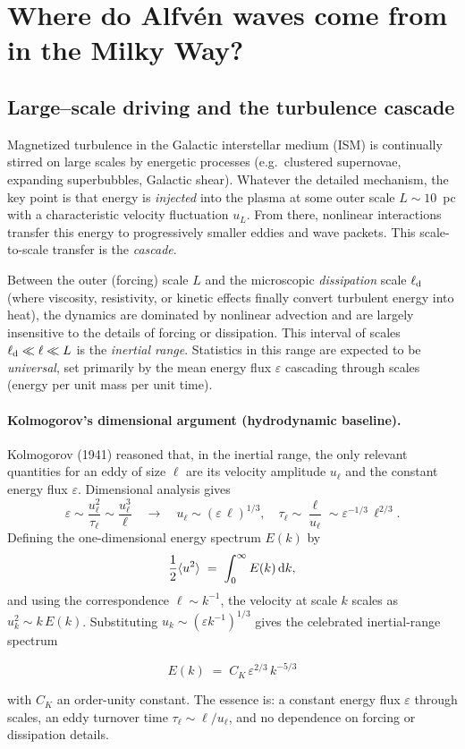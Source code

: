 \section{Where do Alfv\'en waves come from in the Milky Way?}
\subsection{Large–scale driving and the turbulence cascade}

Magnetized turbulence in the Galactic interstellar medium (ISM) is continually stirred on large scales by energetic processes (e.g.\ clustered supernovae, expanding superbubbles, Galactic shear). Whatever the detailed mechanism, the key point is that energy is \emph{injected} into the plasma at some outer scale \(L \sim 10 \)~pc with a characteristic velocity fluctuation \(u_L\). From there, nonlinear interactions transfer this energy to progressively smaller eddies and wave packets. This scale-to-scale transfer is the \emph{cascade}. 

Between the outer (forcing) scale \(L\) and the microscopic \emph{dissipation} scale \(\ell_{\rm d}\) (where viscosity, resistivity, or kinetic effects finally convert turbulent energy into heat), the dynamics are dominated by nonlinear advection and are largely insensitive to the details of forcing or dissipation. This interval of scales \( \ell_{\rm d} \ll \ell \ll L \) is the \emph{inertial range}. Statistics in this range are expected to be \emph{universal}, set primarily by the mean energy flux \(\varepsilon\) cascading through scales (energy per unit mass per unit time).

\paragraph{Kolmogorov’s dimensional argument (hydrodynamic baseline).}
Kolmogorov (1941) reasoned that, in the inertial range, the only relevant quantities for an eddy of size \(\ell\) are its velocity amplitude \(u_\ell\) and the constant energy flux \(\varepsilon\). Dimensional analysis gives
\[
\varepsilon \sim \frac{u_\ell^2}{\tau_\ell}\sim \frac{u_\ell^3}{\ell}
\quad\rightarrow\quad
u_\ell \sim (\varepsilon\,\ell)^{1/3},\quad 
\tau_\ell \sim \frac{\ell}{u_\ell} \sim \varepsilon^{-1/3}\,\ell^{2/3}.
\]
Defining the one-dimensional energy spectrum \(E(k)\) by
\[
\frac{1}{2}\langle u^2\rangle \;=\; \int_0^\infty E(k)\,{\rm d}k,
\]
and using the correspondence \(\ell\sim k^{-1}\), the velocity at scale \(k\) scales as \(u_k^2\sim k\,E(k)\). 
%
Substituting \(u_k\sim (\varepsilon k^{-1})^{1/3}\) gives the celebrated inertial-range spectrum
\begin{remark}
\[
E(k)\;=\; C_K\,\varepsilon^{2/3}\,k^{-5/3}
\]
\end{remark}
with \(C_K\) an order-unity constant. The essence is: a constant energy flux \(\varepsilon\) through scales, an eddy turnover time \(\tau_\ell\sim\ell/u_\ell\), and no dependence on forcing or dissipation details.

